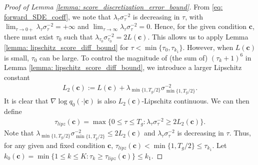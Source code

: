 \documentclass[11pt]{article}
\newcommand{\bc}{\mathbf{c}}
\begin{document}
\begin{proof}[Proof of Lemma \ref{lemma: score_discretization_error_bound}]

From \eqref{eq: forward_SDE_coeff}, we note that $\lambda_\tau\sigma_\tau^{-2}$ is decreasing in $\tau$, with  $\lim_{\tau \to 0+}\lambda_\tau\sigma_\tau^{-2} = +\infty$ and $\lim_{\tau \to \infty}\lambda_\tau\sigma_\tau^{-2} = 0$. Hence, for the given condition $\bc$, there must exist  $\tau_0$ such that $\lambda_{\tau_0}\sigma_{\tau_0}^{-2} = 2L(\bc)$. This allows us to apply Lemma \ref{lemma: lipschitz_score_diff_bound} for $\tau < \min\{\tau_0, \tau_{k_1}\}$. However, when $L(\bc)$ is small, $\tau_0$ can be large. To control the magnitude of (the sum of) $(\tau_k + 1)^6$ in Lemma \ref{lemma: lipschitz_score_diff_bound}, we introduce a larger Lipschitz constant
\begin{align}\label{eq: lipschitz_constant}
    L_2(\bc) := L(\bc) + \lambda_{\min\{1,T_g/2\}}\sigma_{\min\{1, T_g/2\}}^{-2}.
\end{align}
It is clear that $\nabla\log q_0(\cdot | \bc)$ is also $L_2(\bc)$-Lipschitz continuous. We can then define
\begin{align*}%
    \tau_{lipz}(\bc) = \max\big\{0\le \tau\le T_g: \lambda_\tau\sigma_\tau^{-2} \ge 2L_2(\bc)\big\}.
\end{align*}
Note that $\lambda_{\min\{1, T_g/2\}}\sigma_{\min\{1, T_g/2\}}^{-2} \le 2L_2(\bc)$ and $\lambda_\tau\sigma_\tau^{-2}$ is decreasing in $\tau$. Thus, for any given and fixed condition $\bc$, $\tau_{lipz}(\bc) < \min\{1, T_g/2\} \le \tau_{k_1}.$ Let $k_{0}(\bc) = \min\{1\le k \le K: \tau_k \ge \tau_{lipz}(\bc)\}\le k_1$.


\end{proof}
\end{document}
